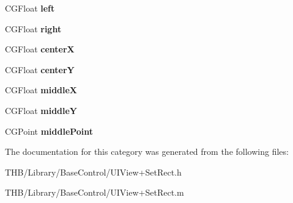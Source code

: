 \begin{DoxyCompactItemize}
C\+G\+Float {\bfseries left}
\item 
\mbox{\label{category_u_i_view_07_set_rect_08_aeb4bd71572d58014ccef226e894e7347}} 
C\+G\+Float {\bfseries right}
\item 
\mbox{\label{category_u_i_view_07_set_rect_08_a264de5e187b6a8429742f9796ecfca1b}} 
C\+G\+Float {\bfseries centerX}
\item 
\mbox{\label{category_u_i_view_07_set_rect_08_a69f7db9faa42cb793bffc60adb381f26}} 
C\+G\+Float {\bfseries centerY}
\item 
\mbox{\label{category_u_i_view_07_set_rect_08_a09b31e8cce38390f96904cad5437ba3d}} 
C\+G\+Float {\bfseries middleX}
\item 
\mbox{\label{category_u_i_view_07_set_rect_08_a407a197a74ddcad05d2bba1454b66a3d}} 
C\+G\+Float {\bfseries middleY}
\item 
\mbox{\label{category_u_i_view_07_set_rect_08_aa4f3c31ce1d5c8eb465ff3165dad7ade}} 
C\+G\+Point {\bfseries middle\+Point}
\end{DoxyCompactItemize}


The documentation for this category was generated from the following files\+:\begin{DoxyCompactItemize}
\item 
T\+H\+B/\+Library/\+Base\+Control/U\+I\+View+\+Set\+Rect.\+h\item 
T\+H\+B/\+Library/\+Base\+Control/U\+I\+View+\+Set\+Rect.\+m\end{DoxyCompactItemize}

